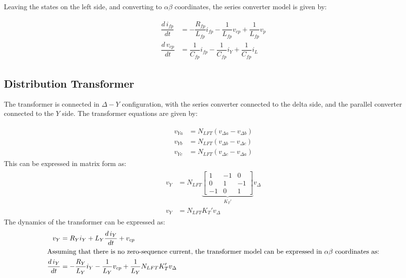 Leaving the states on the left side, and converting to $\alpha\beta$ coordinates, the series converter model is given by:

\begin{align}
    \begin{aligned}
        \dfrac{d\,i_{fp}}{dt} &= -\dfrac{R_{fp}}{L_{fp}}i_{fp} - \dfrac{1}{L_{fp}}v_{cp} + \dfrac{1}{L_{fp}}v_p \\
        \dfrac{d\,v_{cp}}{dt} &= \dfrac{1}{C_{fp}}i_{fp} - \dfrac{1}{C_{fp}}i_Y + \dfrac{1}{C_{fp}}i_L
    \end{aligned}
\end{align}

\subsection{Distribution Transformer}

The transformer is connected in $\Delta-Y$ configuration, with the series converter connected to the delta side, and the parallel converter connected to the $Y$ side. The transformer equations are given by:

\begin{align}
    \begin{aligned}
        v_{Ya} &= N_{LFT}(v_{\Delta a} - v_{\Delta b}) \\
        v_{Yb} &= N_{LFT}(v_{\Delta b} - v_{\Delta c}) \\
        v_{Yc} &= N_{LFT}(v_{\Delta c} - v_{\Delta a})
    \end{aligned}
\end{align}
This can be expressed in matrix form as:
\begin{align}
    \begin{aligned}
        v_Y &= N_{LFT}
        \underbrace{
        \begin{bmatrix}
            1 & -1 & 0 \\
            0 & 1 & -1 \\
            -1 & 0 & 1
        \end{bmatrix}
        }_{K_T'}
        v_{\Delta}\\
        v_Y &= N_{LFT} K_T' v_{\Delta}
    \end{aligned}
\end{align}
The dynamics of the transformer can be expressed as:
\begin{align}
    v_{Y} &= R_Yi_Y + L_Y\dfrac{d\,i_Y}{dt} + v_{cp} \\
    \intertext{Assuming that there is no zero-sequence current, the transformer model can be expressed in $\alpha\beta$ coordinates as:}
    \dfrac{d\,i_Y}{dt} &= -\dfrac{R_Y}{L_Y}i_Y - \dfrac{1}{L_Y}v_{cp} + \dfrac{1}{L_Y}N_{LFT}K_T'v_{\Delta}
\end{align}

